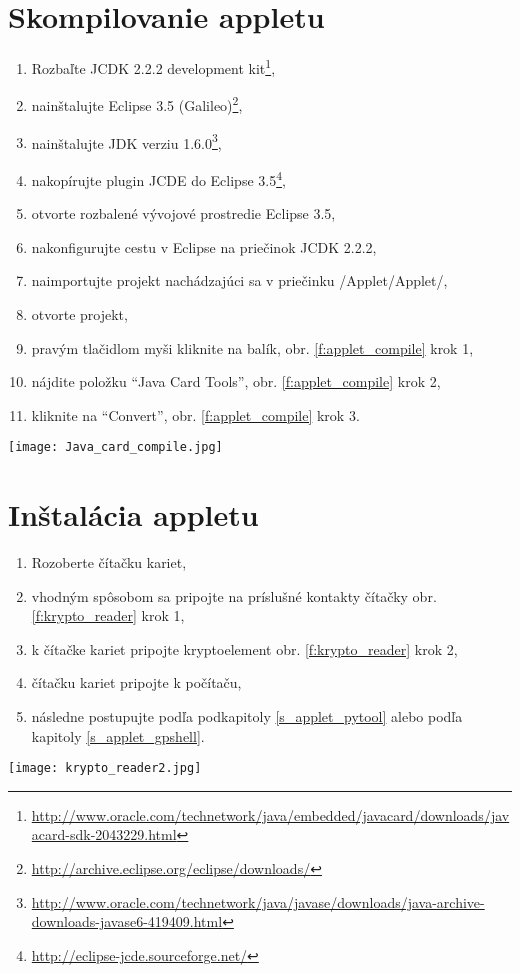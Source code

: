 \documentclass[12pt,a4paper,oneside,openright]{report}
\newcommand{\quotes}[1]{``#1''}
\begin{document}
\section{Skompilovanie appletu} \label{s_applet_compile}
	\begin{enumerate}
		\item Rozbaľte JCDK 2.2.2 development kit\footnote{\url{http://www.oracle.com/technetwork/java/embedded/javacard/downloads/javacard-sdk-2043229.html}},
		\item nainštalujte Eclipse 3.5 (Galileo)\footnote{\url{http://archive.eclipse.org/eclipse/downloads/}},
		\item nainštalujte JDK verziu 1.6.0\footnote{\url{http://www.oracle.com/technetwork/java/javase/downloads/java-archive-downloads-javase6-419409.html}},
		\item nakopírujte plugin JCDE do Eclipse 3.5\footnote{\url{http://eclipse-jcde.sourceforge.net/}},
		\item otvorte rozbalené vývojové prostredie Eclipse 3.5,
		\item nakonfigurujte cestu v Eclipse na priečinok JCDK 2.2.2,
		\item naimportujte projekt nachádzajúci sa v priečinku /Applet/Applet/,
		\item otvorte projekt,
		\item pravým tlačidlom myši kliknite na balík, obr. \ref{f:applet_compile} krok 1,
		\item nájdite položku \quotes{Java Card Tools}, obr. \ref{f:applet_compile} krok 2,
		\item kliknite na \quotes{Convert}, obr. \ref{f:applet_compile} krok 3.
	\end{enumerate}
	
	\begin{figure*}[!htb]
		\centering
		\texttt{[image: Java\_card\_compile.jpg]}
		\caption{Skompilovanie appletu pre kryptoelement.}
		\label{f:applet_compile}
	\end{figure*}
	
 \newpage

\section{Inštalácia appletu} \label{s_applet_install}
	\begin{enumerate}
		\item Rozoberte čítačku kariet, 
		\item vhodným spôsobom sa pripojte na príslušné kontakty čítačky obr.  \ref{f:krypto_reader} krok 1,
		\item k čítačke kariet pripojte kryptoelement obr. \ref{f:krypto_reader} krok 2,
		\item čítačku kariet pripojte k počítaču,
		\item následne postupujte podľa podkapitoly \ref{s_applet_pytool} alebo podľa kapitoly \ref{s_applet_gpshell}.
	\end{enumerate}
	\begin{figure*}[h]
		\centering
		\texttt{[image: krypto\_reader2.jpg]}
		\caption{Pripojenie kryptoelementu k čítačke kariet.}
		\label{f:krypto_reader}
	\end{figure*}
	
\end{document}

